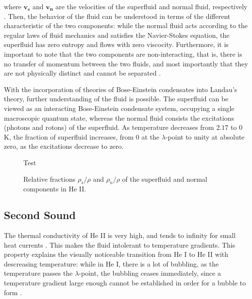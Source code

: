 where $\mathbf{v_s}$ and $\mathbf{v_n}$ are the velocities of the
superfluid and normal fluid, respectively \cite{tilley}. Then, the
behavior of the fluid can be understood in terms of the different
characteristic of the two components: while the normal fluid acts
according to the regular laws of fluid mechanics and satisfies the
Navier-Stokes equation, the superfluid has zero entropy and flows with
zero viscocity. Furthermore, it is important to note that the two
components are non-interacting, that is, there is no transfer of
momentum between the two fluids, and most importantly that they are
not physically distinct and cannot be separated \cite{tilley}.

With the incorporation of theories of Bose-Einstein condensates into
Landau's theory, further understanding of the fluid is possible. The
superfluid can be viewed as an interacting Bose-Einstein condensate
system, occupying a single macroscopic quantum state, whereas the
normal fluid consists the excitations (photons and rotons) of the
superfluid. As temperature decreases from $2.17$ to $0$ K, the
fraction of superfluid increases, from $0$ at the $\lambda$-point to
unity at absolute zero, as the excitations decrease to zero.

\begin{figure}[ht]
\begin{center}

\caption{\small{Test}}
\caption{\small{Relative fractions $\rho_s/\rho$ and $\rho_n/\rho$ of
    the superfluid and normal components in He II.}}
\label{figure:twofluid}
\end{center}
\end{figure}



\subsection{Second Sound}

The thermal conductivity of He II is very high, and tends to infinity
for small heat currents \cite{tilley}. This makes the fluid intolerant
to temperature gradients. This property explains the visually
noticeable transition from He I to He II with descreasing temperature:
while in He I, there is a lot of bubbling, as the temperature passes
the $\lambda$-point, the bubbling ceases immediately, since a
temperature gradient large enough cannot be established in order for a
bubble to form \cite{tilley}.

